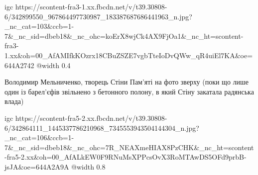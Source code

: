 \ifcmt
  igc https://scontent-fra3-1.xx.fbcdn.net/v/t39.30808-6/342899550_967864497730987_183387687686441963_n.jpg?_nc_cat=103&ccb=1-7&_nc_sid=dbeb18&_nc_ohc=koErX8wjCk4AX9FjOa1&_nc_ht=scontent-fra3-1.xx&oh=00_AfAMIfkKOzrx18CBuZSZE7vgbTteIoDvQWw_qR4uiEl7KA&oe=644A2742
	@width 0.4
\fi


Володимир Мельниченко, творець Стіни Пам'яті на фото зверху (поки що лише один
із барел'єфів звільнено з бетонного полону, в який Стіну закатала радянська
влада)

\ifcmt
  igc https://scontent-fra5-2.xx.fbcdn.net/v/t39.30808-6/342864111_1445337786210968_7345553943504144304_n.jpg?_nc_cat=106&ccb=1-7&_nc_sid=dbeb18&_nc_ohc=7R_NEAXmeHIAX8PzCHK&_nc_ht=scontent-fra5-2.xx&oh=00_AfALkEW0F9RNuMsXPPcsOvX3RoMTAwDS5OFd9prbB-jsJA&oe=644A2A9A
	@width 0.8
\fi
